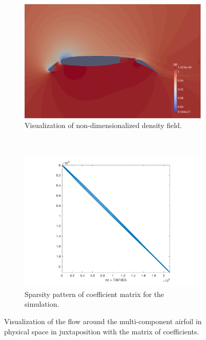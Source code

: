 \documentclass[12pt,portrait]{article}
\begin{document}
\begin{figure}[ht]\centering
   \begin{subfigure}[!ht]{0.5\textwidth}
        \centering
  \vspace{-60pt}
  \includegraphics[width=\columnwidth]{../images/30p30n_non-dim_density.png}
  \caption{Visualization of non-dimensionalized density field.}
  \label{fig:30p30n_non-dim_density}
  \end{subfigure}%
  ~
   \begin{subfigure}[!ht]{0.5\textwidth}
        \centering
  \vspace{-60pt}
  \includegraphics[width=\columnwidth]{../images/30p30n_sparsity.png}
  \caption{Sparsity pattern of coefficient matrix for the simulation.}
  \label{fig:30p30n_sparsity}
  \end{subfigure}%
  \caption{Visualization of the flow around the multi-component airfoil in physical space in juxtaposition with the matrix of coefficients.}
  \label{fig:30p30n_solution}
\end{figure}
\end{document}
